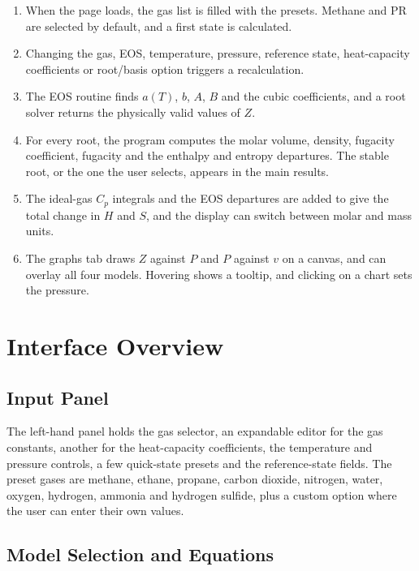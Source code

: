 \documentclass[11pt,a4paper]{article}
\begin{document}
\begin{enumerate}
  \item When the page loads, the gas list is filled with the presets. Methane and PR are selected by default, and a first state is calculated.
  \item Changing the gas, EOS, temperature, pressure, reference state, heat-capacity coefficients or root/basis option triggers a recalculation.
  \item The EOS routine finds $a(T)$, $b$, $A$, $B$ and the cubic coefficients, and a root solver returns the physically valid values of $Z$.
  \item For every root, the program computes the molar volume, density, fugacity coefficient, fugacity and the enthalpy and entropy departures. The stable root, or the one the user selects, appears in the main results.
  \item The ideal-gas $C_p$ integrals and the EOS departures are added to give the total change in $H$ and $S$, and the display can switch between molar and mass units.
  \item The graphs tab draws $Z$ against $P$ and $P$ against $v$ on a canvas, and can overlay all four models. Hovering shows a tooltip, and clicking on a chart sets the pressure.
\end{enumerate}

\section{Interface Overview}

\subsection{Input Panel}

The left-hand panel holds the gas selector, an expandable editor for the gas constants, another for the heat-capacity coefficients, the temperature and pressure controls, a few quick-state presets and the reference-state fields. The preset gases are methane, ethane, propane, carbon dioxide, nitrogen, water, oxygen, hydrogen, ammonia and hydrogen sulfide, plus a custom option where the user can enter their own values.

\subsection{Model Selection and Equations}
\end{document}
